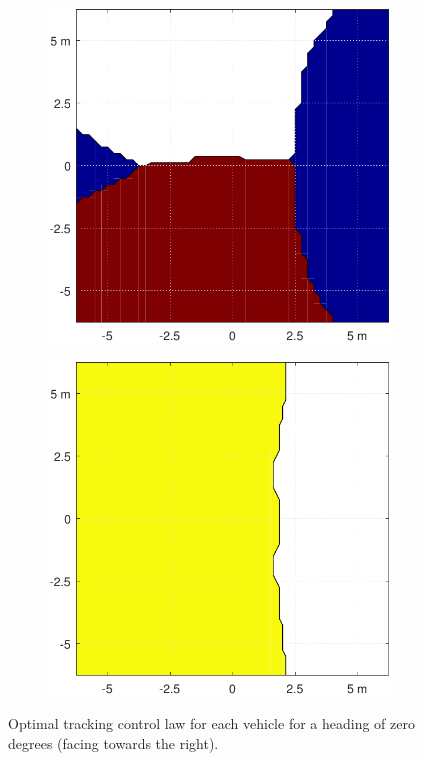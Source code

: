 \begin{figure}[!htb]
  \centering
  \begin{subfigure}{0.5\textwidth}
    \includegraphics[width=\columnwidth]{figs/Wcontrol}
    \label{fig:Wcontrol}
  \end{subfigure}%
  \begin{subfigure}{0.5\textwidth}
    \includegraphics[width=\columnwidth]{figs/Vcontrol}
    \label{fig:Vcontrol}
  \end{subfigure}%
  
  \caption{Optimal tracking control law for each vehicle for a heading of zero degrees (facing towards the right).}
  \label{fig:reactivity}
\end{figure}

